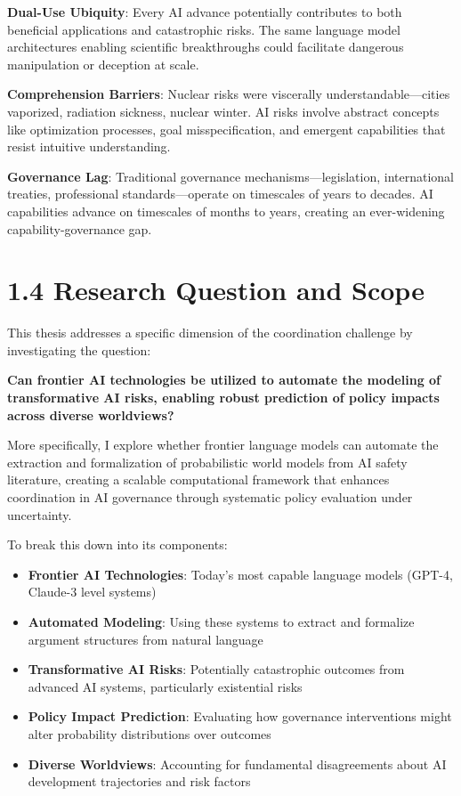 \documentclass[
  11pt,
  letterpaper,
]{book}
\providecommand{\tightlist}{%
  \setlength{\itemsep}{0pt}\setlength{\parskip}{0pt}}
\begin{document}
\textbf{Dual-Use Ubiquity}: Every AI advance potentially contributes to
both beneficial applications and catastrophic risks. The same language
model architectures enabling scientific breakthroughs could facilitate
dangerous manipulation or deception at scale.

\textbf{Comprehension Barriers}: Nuclear risks were viscerally
understandable---cities vaporized, radiation sickness, nuclear winter.
AI risks involve abstract concepts like optimization processes, goal
misspecification, and emergent capabilities that resist intuitive
understanding.

\textbf{Governance Lag}: Traditional governance
mechanisms---legislation, international treaties, professional
standards---operate on timescales of years to decades. AI capabilities
advance on timescales of months to years, creating an ever-widening
capability-governance gap.

\section*{1.4 Research Question and Scope}\label{sec-research-question}


This thesis addresses a specific dimension of the coordination challenge
by investigating the question:

\textbf{Can frontier AI technologies be utilized to automate the
modeling of transformative AI risks, enabling robust prediction of
policy impacts across diverse worldviews?}

More specifically, I explore whether frontier language models can
automate the extraction and formalization of probabilistic world models
from AI safety literature, creating a scalable computational framework
that enhances coordination in AI governance through systematic policy
evaluation under uncertainty.

To break this down into its components:

\begin{itemize}
\tightlist
\item
  \textbf{Frontier AI Technologies}: Today's most capable language
  models (GPT-4, Claude-3 level systems)
\item
  \textbf{Automated Modeling}: Using these systems to extract and
  formalize argument structures from natural language
\item
  \textbf{Transformative AI Risks}: Potentially catastrophic outcomes
  from advanced AI systems, particularly existential risks
\item
  \textbf{Policy Impact Prediction}: Evaluating how governance
  interventions might alter probability distributions over outcomes
\item
  \textbf{Diverse Worldviews}: Accounting for fundamental disagreements
  about AI development trajectories and risk factors
\end{itemize}
\end{document}
